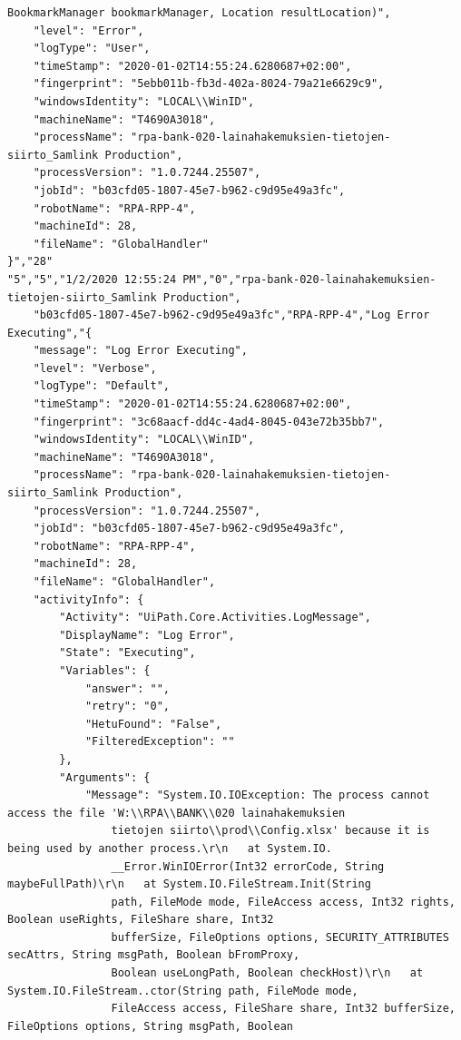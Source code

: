 \begin{Verbatim}[fontsize=\tiny]
        BookmarkManager bookmarkManager, Location resultLocation)",
    "level": "Error",
    "logType": "User",
    "timeStamp": "2020-01-02T14:55:24.6280687+02:00",
    "fingerprint": "5ebb011b-fb3d-402a-8024-79a21e6629c9",
    "windowsIdentity": "LOCAL\\WinID",
    "machineName": "T4690A3018",
    "processName": "rpa-bank-020-lainahakemuksien-tietojen-siirto_Samlink Production",
    "processVersion": "1.0.7244.25507",
    "jobId": "b03cfd05-1807-45e7-b962-c9d95e49a3fc",
    "robotName": "RPA-RPP-4",
    "machineId": 28,
    "fileName": "GlobalHandler"
}","28"
"5","5","1/2/2020 12:55:24 PM","0","rpa-bank-020-lainahakemuksien-tietojen-siirto_Samlink Production",
    "b03cfd05-1807-45e7-b962-c9d95e49a3fc","RPA-RPP-4","Log Error Executing","{
    "message": "Log Error Executing",
    "level": "Verbose",
    "logType": "Default",
    "timeStamp": "2020-01-02T14:55:24.6280687+02:00",
    "fingerprint": "3c68aacf-dd4c-4ad4-8045-043e72b35bb7",
    "windowsIdentity": "LOCAL\\WinID",
    "machineName": "T4690A3018",
    "processName": "rpa-bank-020-lainahakemuksien-tietojen-siirto_Samlink Production",
    "processVersion": "1.0.7244.25507",
    "jobId": "b03cfd05-1807-45e7-b962-c9d95e49a3fc",
    "robotName": "RPA-RPP-4",
    "machineId": 28,
    "fileName": "GlobalHandler",
    "activityInfo": {
        "Activity": "UiPath.Core.Activities.LogMessage",
        "DisplayName": "Log Error",
        "State": "Executing",
        "Variables": {
            "answer": "",
            "retry": "0",
            "HetuFound": "False",
            "FilteredException": ""
        },
        "Arguments": {
            "Message": "System.IO.IOException: The process cannot access the file 'W:\\RPA\\BANK\\020 lainahakemuksien
                tietojen siirto\\prod\\Config.xlsx' because it is being used by another process.\r\n   at System.IO.
                __Error.WinIOError(Int32 errorCode, String maybeFullPath)\r\n   at System.IO.FileStream.Init(String
                path, FileMode mode, FileAccess access, Int32 rights, Boolean useRights, FileShare share, Int32
                bufferSize, FileOptions options, SECURITY_ATTRIBUTES secAttrs, String msgPath, Boolean bFromProxy,
                Boolean useLongPath, Boolean checkHost)\r\n   at System.IO.FileStream..ctor(String path, FileMode mode,
                FileAccess access, FileShare share, Int32 bufferSize, FileOptions options, String msgPath, Boolean

\end{Verbatim}
